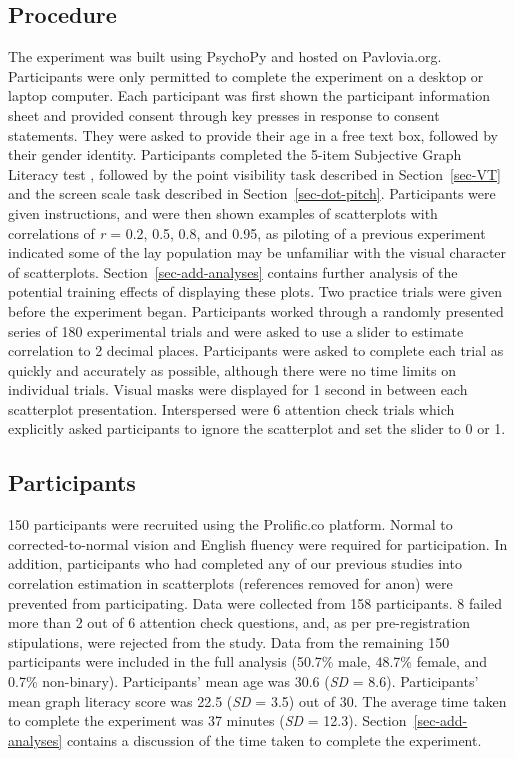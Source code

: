 \documentclass[manuscript, review, anonymous, screen]{acmart}
\begin{document}
\hypertarget{sec-gen-procedure}{%
\subsection{Procedure}\label{sec-gen-procedure}}

The experiment was built using PsychoPy \citep{pierce_2019} and hosted
on Pavlovia.org. Participants were only permitted to complete the
experiment on a desktop or laptop computer. Each participant was first
shown the participant information sheet and provided consent through key
presses in response to consent statements. They were asked to provide
their age in a free text box, followed by their gender identity.
Participants completed the 5-item Subjective Graph Literacy test
\citep{garcia_2016}, followed by the point visibility task described in
Section~\ref{sec-VT} and the screen scale task described in
Section~\ref{sec-dot-pitch}. Participants were given instructions, and
were then shown examples of scatterplots with correlations of \emph{r} =
0.2, 0.5, 0.8, and 0.95, as piloting of a previous experiment indicated
some of the lay population may be unfamiliar with the visual character
of scatterplots. Section~\ref{sec-add-analyses} contains further
analysis of the potential training effects of displaying these plots.
Two practice trials were given before the experiment began. Participants
worked through a randomly presented series of 180 experimental trials
and were asked to use a slider to estimate correlation to 2 decimal
places. Participants were asked to complete each trial as quickly and
accurately as possible, although there were no time limits on individual
trials. Visual masks were displayed for 1 second in between each
scatterplot presentation. Interspersed were 6 attention check trials
which explicitly asked participants to ignore the scatterplot and set
the slider to 0 or 1.

\hypertarget{sec-participants}{%
\subsection{Participants}\label{sec-participants}}

150 participants were recruited using the Prolific.co platform. Normal
to corrected-to-normal vision and English fluency were required for
participation. In addition, participants who had completed any of our
previous studies into correlation estimation in scatterplots (references
removed for anon) were prevented from participating. Data were collected
from 158 participants. 8 failed more than 2 out of 6 attention check
questions, and, as per pre-registration stipulations, were rejected from
the study. Data from the remaining 150 participants were included in the
full analysis (50.7\% male, 48.7\% female, and 0.7\% non-binary).
Participants' mean age was 30.6 (\emph{SD} = 8.6). Participants' mean
graph literacy score was 22.5 (\emph{SD} = 3.5) out of 30. The average
time taken to complete the experiment was 37 minutes (\emph{SD} = 12.3).
Section~\ref{sec-add-analyses} contains a discussion of the time taken
to complete the experiment.
\end{document}
